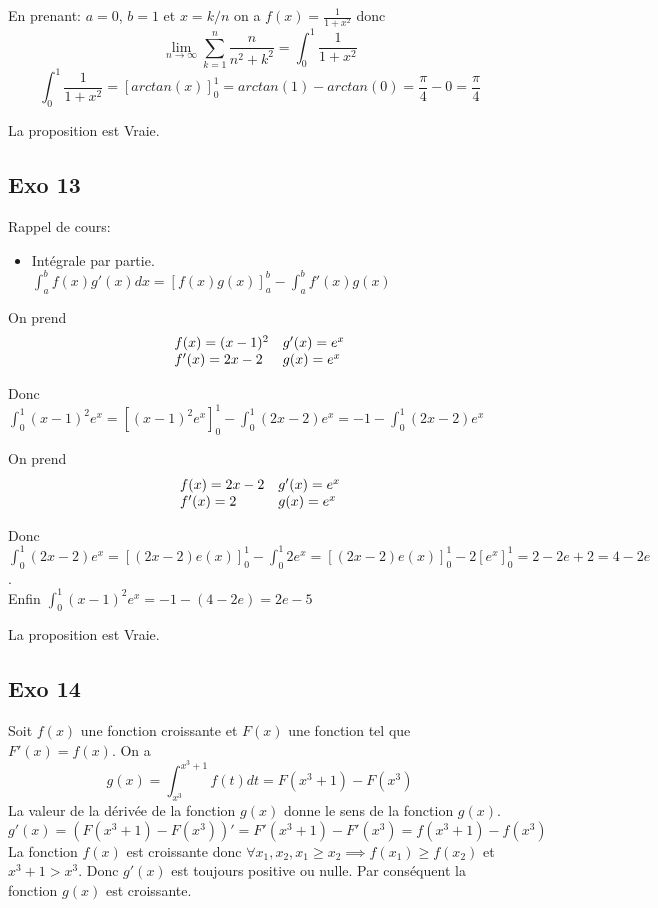 \documentclass[]{book}
\theoremstyle{definition}
\begin{document}
En prenant: $a=0$, $b=1$ et $x=k/n$ on a $f(x)=\frac{1}{1+x^2}$ donc
$$\lim_{n \to \infty}\sum_{k=1}^{n}\frac{n}{n^2+k^2} = \int_0^1 \frac{1}{1+x^2}$$
$$\int_0^1 \frac{1}{1+x^2} = [arctan(x)]_0^1 = arctan(1) - arctan(0) = \frac{\pi}{4} - 0 = \frac{\pi}{4}$$

La proposition est Vraie.

\subsection*{Exo 13}
Rappel de cours:
\begin{itemize}
\item Int\'egrale par partie. $\int_{a}^{b} f(x)g'(x)dx = [f(x)g(x)]_{a}^{b} - \int_{a}^{b}f'(x)g(x)$
\end{itemize}

On prend
$$
\begin{array}{l l}
 f(x) = (x-1)^2 & g'(x) = e^x\\
 f'(x) = 2x-2   & g(x) = e^x\\
\end{array}
$$

\medskip
Donc $\int_0^1(x-1)^2e^x = [(x-1)^2e^x]_0^1 - \int_0^1 (2x-2)e^x = -1 - \int_0^1 (2x-2)e^x$

On prend
$$
\begin{array}{l l}
 f(x) = 2x-2 & g'(x) = e^x\\
 f'(x) = 2   & g(x) = e^x\\
\end{array}
$$

\medskip
Donc $\int_0^1 (2x-2)e^x = [(2x-2)e(x)]_0^1 - \int_0^1 2e^x = [(2x-2)e(x)]_0^1 - 2[e^x]_0^1 = 2 - 2e + 2 = 4 - 2e$.\\

Enfin $\int_0^1(x-1)^2e^x = -1 - (4 - 2e) = 2e - 5$


La proposition est Vraie.

\subsection*{Exo 14}

Soit $f(x)$ une fonction croissante et $F(x)$ une fonction tel que $F'(x) = f(x)$. On a
$$g(x) = \int_{x^3}^{x^3+1}f(t)dt = F(x^3+1) - F(x^3)$$
La valeur de la d\'eriv\'ee de la fonction $g(x)$ donne le sens de la fonction $g(x)$.
$$g'(x) = (F(x^3+1) - F(x^3))' = F'(x^3+1) - F'(x^3) = f(x^3+1) - f(x^3)$$
La fonction $f(x)$ est croissante donc $\forall x_1, x_2, x_1 \geq x_2 \implies f(x_1) \geq f(x_2)$ et $x^3+1 > x^3$. Donc $g'(x)$ est toujours positive ou nulle. Par cons\'equent la fonction $g(x)$ est croissante.
\end{document}
